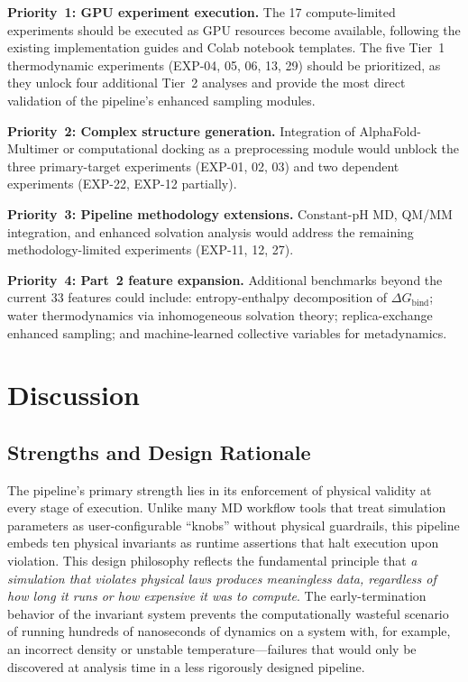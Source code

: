 \documentclass[conference]{IEEEtran}
\begin{document}
\textbf{Priority~1: GPU experiment execution.}  The 17 compute-limited
experiments should be executed as GPU resources become available, following
the existing implementation guides and Colab notebook templates.  The
five Tier~1 thermodynamic experiments (EXP-04, 05, 06, 13, 29) should be
prioritized, as they unlock four additional Tier~2 analyses and provide
the most direct validation of the pipeline's enhanced sampling modules.

\textbf{Priority~2: Complex structure generation.}  Integration of
AlphaFold-Multimer or computational docking as a preprocessing module
would unblock the three primary-target experiments (EXP-01, 02, 03) and
two dependent experiments (EXP-22, EXP-12 partially).

\textbf{Priority~3: Pipeline methodology extensions.}  Constant-pH MD,
QM/MM integration, and enhanced solvation analysis would address the
remaining methodology-limited experiments (EXP-11, 12, 27).

\textbf{Priority~4: Part~2 feature expansion.}  Additional benchmarks
beyond the current 33 features could include: entropy-enthalpy
decomposition of $\Delta G_{\mathrm{bind}}$; water thermodynamics via
inhomogeneous solvation theory; replica-exchange enhanced sampling; and
machine-learned collective variables for metadynamics.

\section{Discussion}\label{sec:discussion}

\subsection{Strengths and Design Rationale}

The pipeline's primary strength lies in its enforcement of physical validity
at every stage of execution.  Unlike many MD workflow tools that treat
simulation parameters as user-configurable ``knobs'' without physical
guardrails, this pipeline embeds ten physical invariants as runtime
assertions that halt execution upon violation.  This design philosophy
reflects the fundamental principle that \emph{a simulation that violates
physical laws produces meaningless data, regardless of how long it runs or
how expensive it was to compute}.  The early-termination behavior of the
invariant system prevents the computationally wasteful scenario of running
hundreds of nanoseconds of dynamics on a system with, for example, an
incorrect density or unstable temperature---failures that would only be
discovered at analysis time in a less rigorously designed pipeline.
\end{document}
